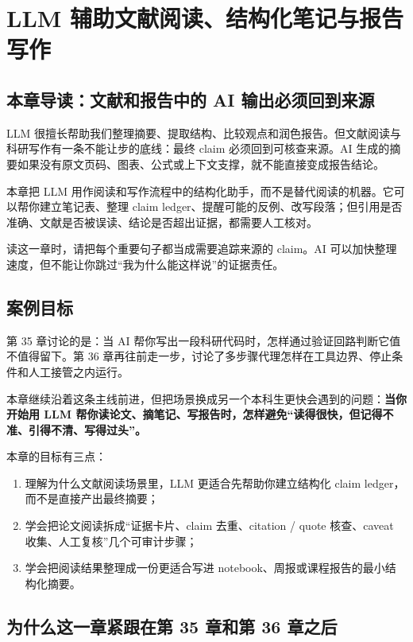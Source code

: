 \chapter{LLM 辅助文献阅读、结构化笔记与报告写作}

\section{本章导读：文献和报告中的 AI 输出必须回到来源}

LLM 很擅长帮助我们整理摘要、提取结构、比较观点和润色报告。但文献阅读与科研写作有一条不能让步的底线：最终 claim 必须回到可核查来源。AI 生成的摘要如果没有原文页码、图表、公式或上下文支撑，就不能直接变成报告结论。

本章把 LLM 用作阅读和写作流程中的结构化助手，而不是替代阅读的机器。它可以帮你建立笔记表、整理 claim ledger、提醒可能的反例、改写段落；但引用是否准确、文献是否被误读、结论是否超出证据，都需要人工核对。

读这一章时，请把每个重要句子都当成需要追踪来源的 claim。AI 可以加快整理速度，但不能让你跳过“我为什么能这样说”的证据责任。

\section{案例目标}

第 35 章讨论的是：当 AI 帮你写出一段科研代码时，怎样通过验证回路判断它值不值得留下。第 36 章再往前走一步，讨论了多步骤代理怎样在工具边界、停止条件和人工接管之内运行。

本章继续沿着这条主线前进，但把场景换成另一个本科生更快会遇到的问题：\textbf{当你开始用 LLM 帮你读论文、摘笔记、写报告时，怎样避免“读得很快，但记得不准、引得不清、写得过头”。}

本章的目标有三点：

\begin{enumerate}
    \item 理解为什么文献阅读场景里，LLM 更适合先帮助你建立结构化 claim ledger，而不是直接产出最终摘要；
    \item 学会把论文阅读拆成“证据卡片、claim 去重、citation / quote 核查、caveat 收集、人工复核”几个可审计步骤；
    \item 学会把阅读结果整理成一份更适合写进 notebook、周报或课程报告的最小结构化摘要。
\end{enumerate}

\section{为什么这一章紧跟在第 35 章和第 36 章之后}

